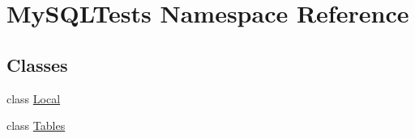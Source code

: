 \hypertarget{namespace_my_s_q_l_tests}{}\section{My\+S\+Q\+L\+Tests Namespace Reference}
\label{namespace_my_s_q_l_tests}
\subsection*{Classes}
\begin{DoxyCompactItemize}
\item 
class \mbox{\hyperlink{class_my_s_q_l_tests_1_1_local}{Local}}
\item 
class \mbox{\hyperlink{class_my_s_q_l_tests_1_1_tables}{Tables}}
\end{DoxyCompactItemize}
